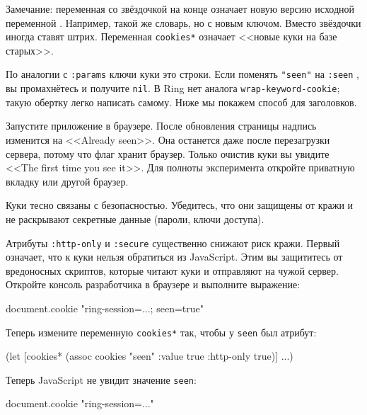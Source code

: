 Замечание: переменная со звёздочкой на конце означает новую версию исходной
переменной . Например, такой же словарь, но с новым ключом. Вместо
звёздочки иногда ставят штрих. Переменная \verb|cookies*| означает <<новые
куки на базе старых>>.


По аналогии с \verb|:params| ключи куки это строки. Если поменять
\verb|"seen"| на \verb|:seen| , вы промахнётесь и получите
\verb|nil|. В Ring нет аналога \verb|wrap-keyword-cookie|; такую обертку
легко написать самому. Ниже мы покажем способ для заголовков.

Запустите приложение в браузере. После обновления страницы надпись изменится на
<<Already seen>>. Она останется даже после перезагрузки сервера, потому что флаг
хранит браузер. Только очистив куки вы увидите <<The first time you see
it>>. Для полноты эксперимента откройте приватную вкладку или другой браузер.


Куки тесно связаны с безопасностью. Убедитесь, что они защищены от кражи и не
раскрывают секретные данные (пароли, ключи доступа).

Атрибуты \verb|:http-only| и \verb|:secure| существенно снижают риск
кражи. Первый означает, что к куки нельзя обратиться из JavaScript. Этим вы
защититесь от вредоносных скриптов, которые читают куки и отправляют на чужой
сервер. Откройте консоль разработчика в браузере и выполните выражение:

\begin{english}
  \begin{js}
document.cookie
"ring-session=...; seen=true"
  \end{js}
\end{english}

Теперь измените переменную \verb|cookies*| так, чтобы у \verb|seen| был
атрибут:


\begin{english}
  \begin{clojure}
(let [cookies* (assoc cookies "seen"
                      {:value true :http-only true})]
  ...)
  \end{clojure}
\end{english}

Теперь JavaScript не увидит значение \verb|seen|:

\begin{english}
  \begin{js}
document.cookie
"ring-session=..."
  \end{js}
\end{english}

